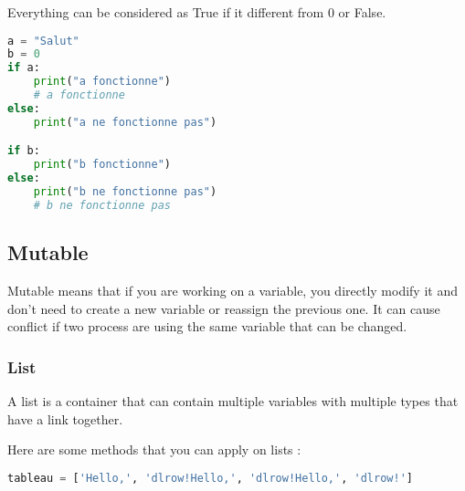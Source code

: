 \documentclass[a4paper, 12pt, titlepage]{scrartcl} %
\begin{document}
\vspace{5mm}

Everything can be considered as True if it different from 0 or False. 

\begin{lstlisting}[language=Python]
a = "Salut"
b = 0
if a:
	print("a fonctionne")
	# a fonctionne
else:
	print("a ne fonctionne pas")

if b:
	print("b fonctionne")
else:
	print("b ne fonctionne pas")
	# b ne fonctionne pas
\end{lstlisting} \vspace{5mm}

\subsection{Mutable}
Mutable means that if you are working on a variable, you directly modify it and don't need to create a new variable or reassign the previous one. It can cause conflict if two process are using the same variable that can be changed.

\subsubsection{List}
A list is a container that can contain multiple variables with multiple types that have a link together.

\vspace{5mm}

Here are some methods that you can apply on lists : 

\begin{lstlisting}[language=Python]
tableau = ['Hello,', 'dlrow!Hello,', 'dlrow!Hello,', 'dlrow!']
\end{lstlisting} \vspace{5mm}
\end{document}

